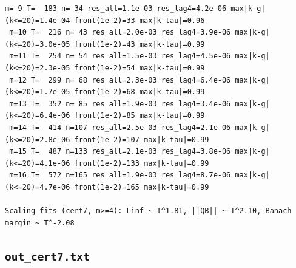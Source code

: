 \documentclass[11pt,reqno]{amsart}
\numberwithin{equation}{section}
\theoremstyle{plain}
\theoremstyle{definition}
\theoremstyle{remark}
\begin{document}
\begin{lstlisting}[style=out]
 m= 9 T=  183 n= 34 res_all=1.1e-03 res_lag4=4.2e-06 max|k-g|(k<=20)=1.4e-04 front(1e-2)=33 max|k-tau|=0.96
 m=10 T=  216 n= 43 res_all=2.0e-03 res_lag4=3.9e-06 max|k-g|(k<=20)=3.0e-05 front(1e-2)=43 max|k-tau|=0.99
 m=11 T=  254 n= 54 res_all=1.5e-03 res_lag4=4.5e-06 max|k-g|(k<=20)=2.3e-05 front(1e-2)=54 max|k-tau|=0.99
 m=12 T=  299 n= 68 res_all=2.3e-03 res_lag4=6.4e-06 max|k-g|(k<=20)=1.7e-05 front(1e-2)=68 max|k-tau|=0.99
 m=13 T=  352 n= 85 res_all=1.9e-03 res_lag4=3.4e-06 max|k-g|(k<=20)=6.4e-06 front(1e-2)=85 max|k-tau|=0.99
 m=14 T=  414 n=107 res_all=2.5e-03 res_lag4=2.1e-06 max|k-g|(k<=20)=2.8e-06 front(1e-2)=107 max|k-tau|=0.99
 m=15 T=  487 n=133 res_all=2.1e-03 res_lag4=3.8e-06 max|k-g|(k<=20)=4.1e-06 front(1e-2)=133 max|k-tau|=0.99
 m=16 T=  572 n=165 res_all=1.9e-03 res_lag4=8.7e-06 max|k-g|(k<=20)=4.7e-06 front(1e-2)=165 max|k-tau|=0.99

Scaling fits (cert7, m>=4): Linf ~ T^1.81, ||QB|| ~ T^2.10, Banach margin ~ T^-2.08
\end{lstlisting}

\subsection{\texttt{out\_cert7.txt}}
\label{app:out-routeB-cert7}
\end{document}
